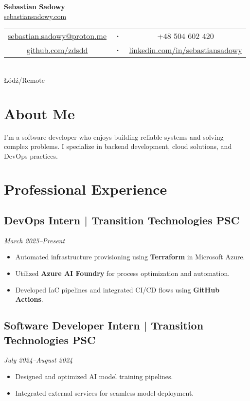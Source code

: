 \documentclass[a4paper,10pt]{article}
\begin{document}
\begin{center}
    {\Huge\textbf{Sebastian Sadowy}} \\[0.3cm]
    \href{https://sebastiansadowy.com}{sebastiansadowy.com} \\[0.2cm]
    \begin{tabular}{c c c}
        \href{mailto:sebastian.sadowy@proton.me}{sebastian.sadowy@proton.me} &
        \textbf{·} &
        +48 504 602 420 \\
        \href{https://github.com/zdsdd}{github.com/zdsdd} &
        \textbf{·} &
        \href{https://www.linkedin.com/in/sebastiansadowy}{linkedin.com/in/sebastiansadowy}
    \end{tabular} \\
    Łódź/Remote
\end{center}

\section{About Me}
I'm a software developer who enjoys building reliable systems and solving complex problems. I specialize in backend development, cloud solutions, and DevOps practices.

\section{Professional Experience}

\subsection{DevOps Intern | Transition Technologies PSC}
\textit{March 2025--Present}
\begin{itemize}[leftmargin=0.5cm, nosep]
    \item Automated infrastructure provisioning using \textbf{Terraform} in Microsoft Azure.
    \item Utilized \textbf{Azure AI Foundry} for process optimization and automation.
    \item Developed IaC pipelines and integrated CI/CD flows using \textbf{GitHub Actions}.
\end{itemize}

\subsection{Software Developer Intern | Transition Technologies PSC}
\textit{July 2024--August 2024}
\begin{itemize}[leftmargin=0.5cm, nosep]
    \item Designed and optimized AI model training pipelines.
    \item Integrated external services for seamless model deployment.
\end{itemize}
\end{document}

